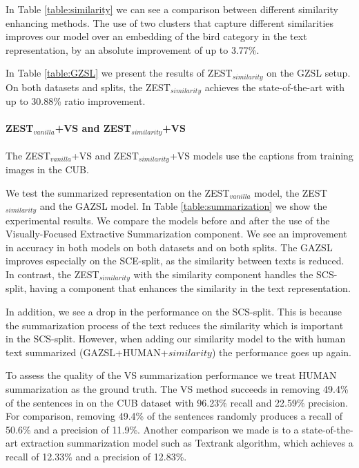 \documentclass[11pt,a4paper]{article}
\begin{document}
In Table \ref{table:similarity} we can see a comparison between different similarity enhancing methods. The use of two clusters that capture different similarities improves our model over an embedding of the bird category in the text representation, by an absolute improvement of up to 3.77\%.
\par

In Table \ref{table:GZSL} we present the results of ZEST$_{similarity}$ on the GZSL setup. On both datasets and splits, the ZEST$_{similarity}$ achieves the state-of-the-art with up to 30.88\% ratio improvement.

\paragraph{ZEST$_{vanilla}$+VS and ZEST$_{similarity}$+VS }
The ZEST$_{vanilla}$+VS and  ZEST$_{similarity}$+VS models use the captions from training images in the CUB. 

We test the summarized representation on the ZEST$_{vanilla}$ model, the ZEST$_{similarity}$ and the GAZSL \citep{zhu2018generative} model. In Table \ref{table:summarization} we show the experimental results. We compare the models before and after the use of the Visually-Focused  Extractive Summarization component. We see an improvement in accuracy in both models on both datasets and on both splits. The GAZSL improves especially on the SCE-split, as the similarity between texts is reduced. In contrast, the ZEST$_{similarity}$ with the similarity component handles the SCS-split, having a component that enhances the similarity in the text representation.  \par

In addition, we see a drop in the \citep{zhu2018generative} performance on the SCS-split. This is because the summarization process of the text reduces the similarity which is important in the SCS-split. However, when adding our similarity model to the \citep{zhu2018generative} with human text summarized (GAZSL+HUMAN+$similarity$) the performance goes up again.
\par  

To assess the quality of the VS summarization performance we treat HUMAN summarization as the ground truth. The VS method succeeds in removing 49.4\% of the sentences in on the CUB dataset with 96.23\% recall and 22.59\% precision. For comparison, removing 49.4\% of the sentences randomly produces a recall of 50.6\% and a precision of 11.9\%.
Another comparison we made is to a state-of-the-art extraction summarization model such as  Textrank \citep{mihalcea2004textrank} algorithm, which achieves a recall of 12.33\% and a precision of 12.83\%.
\end{document}
